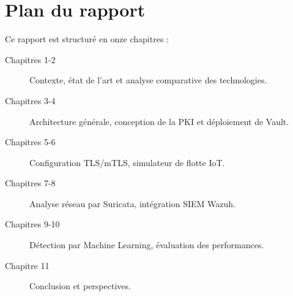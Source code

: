 \section{Plan du rapport}

Ce rapport est structuré en onze chapitres :

\begin{description}
  \item[Chapitres 1-2] Contexte, état de l'art et analyse comparative des technologies.
  \item[Chapitres 3-4] Architecture générale, conception de la PKI et déploiement de Vault.
  \item[Chapitres 5-6] Configuration TLS/mTLS, simulateur de flotte IoT.
  \item[Chapitres 7-8] Analyse réseau par Suricata, intégration SIEM Wazuh.
  \item[Chapitres 9-10] Détection par Machine Learning, évaluation des performances.
  \item[Chapitre 11] Conclusion et perspectives.
\end{description}
